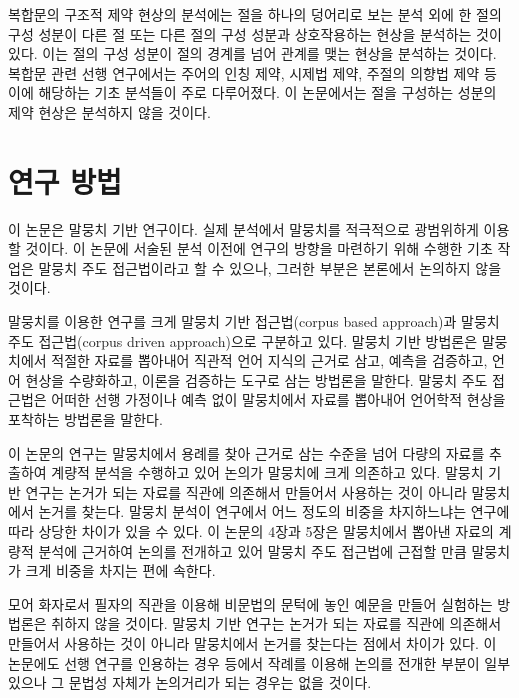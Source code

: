 복합문의 구조적 제약 현상의 분석에는 절을 하나의 덩어리로 보는 분석 외에 한
절의 구성 성분이 다른 절 또는 다른 절의 구성 성분과 상호작용하는 현상을
분석하는 것이 있다. 이는 절의 구성 성분이 절의 경계를 넘어 관계를 맺는 현상을
분석하는 것이다. 복합문 관련 선행 연구에서는 주어의 인칭 제약, 시제법 제약,
주절의 의향법 제약 등 이에 해당하는 기초 분석들이 주로 다루어졌다. 이
논문에서는 절을 구성하는 성분의 제약 현상은 분석하지 않을 것이다.



\section{연구 방법}

이 논문은 말뭉치 기반 연구이다. 실제 분석에서 말뭉치를 적극적으로
광범위하게 이용할 것이다. 이 논문에 서술된 분석 이전에 연구의 방향을 마련하기
위해 수행한 기초 작업은 말뭉치 주도 접근법이라고 할 수 있으나, 그러한 부분은 본론에서
논의하지 않을 것이다. 

\citet{Tognini-Bonelli2001}\는 말뭉치를 이용한 연구를 크게 말뭉치 기반
접근법(corpus based approach)과 말뭉치 주도 접근법(corpus driven approach)으로
구분하고 있다. 말뭉치 기반 방법론은 말뭉치에서 적절한 자료를 뽑아내어 직관적
언어 지식의 근거로 삼고, 예측을 검증하고, 언어 현상을 수량화하고, 이론을
검증하는 도구로 삼는 방법론을 말한다. 말뭉치 주도 접근법은 어떠한 선행 가정이나
예측 없이 말뭉치에서 자료를 뽑아내어 언어학적 현상을 포착하는 방법론을 말한다.


이 논문의 연구는 말뭉치에서 용례를 찾아 근거로 삼는 수준을 넘어 다량의 자료를
추출하여 계량적 분석을 수행하고 있어 논의가 말뭉치에 크게 의존하고 있다. 말뭉치
기반 연구는 논거가 되는 자료를 직관에 의존해서 만들어서 사용하는 것이 아니라
말뭉치에서 논거를 찾는다. 말뭉치 분석이 연구에서 어느 정도의 비중을
차지하느냐는 연구에 따라 상당한 차이가 있을 수 있다.  이 논문의 4장과 5장은
말뭉치에서 뽑아낸 자료의 계량적 분석에 근거하여 논의를 전개하고 있어 말뭉치
주도 접근법에 근접할 만큼 말뭉치가 크게 비중을 차지는 편에 속한다.

모어 화자로서 필자의 직관을 이용해 비문법의 문턱에 놓인 예문을 만들어 실험하는
방법론은 취하지 않을 것이다. 말뭉치 기반 연구는 논거가 되는 자료를 직관에
의존해서 만들어서 사용하는 것이 아니라 말뭉치에서 논거를 찾는다는 점에서 차이가
있다. 이 논문에도 선행 연구를 인용하는 경우 등에서 작례를 이용해 논의를 전개한
부분이 일부 있으나 그 문법성 자체가 논의거리가 되는 경우는 없을 것이다.

